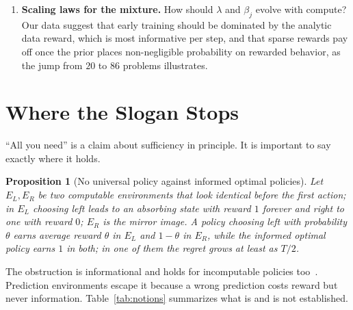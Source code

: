 \documentclass[11pt]{article}
\newtheorem{proposition}{Proposition}
\theoremstyle{definition}
\begin{document}
\begin{enumerate}[leftmargin=*,label=\textbf{P\arabic*.},itemsep=3pt]
\item \textbf{Scaling laws for the mixture.} How should $\lambda$ and $\beta_j$ evolve with compute? Our data suggest that early training should be dominated by the analytic data reward, which is most informative per step, and that sparse rewards pay off once the prior places non-negligible probability on rewarded behavior, as the jump from $20$ to $86$ problems illustrates.
\end{enumerate}

\section{Where the Slogan Stops}\label{sec:limits}

``All you need'' is a claim about sufficiency in principle. It is important to say exactly where it holds.

\begin{proposition}[No universal policy against informed optimal policies]\label{prop:trap}
Let $E_L,E_R$ be two computable environments that look identical before the first action; in $E_L$ choosing left leads to an absorbing state with reward $1$ forever and right to one with reward $0$; $E_R$ is the mirror image. A policy choosing left with probability $\theta$ earns average reward $\theta$ in $E_L$ and $1-\theta$ in $E_R$, while the informed optimal policy earns $1$ in both; in one of them the regret grows at least as $T/2$.
\end{proposition}

\noindent The obstruction is informational and holds for incomputable policies too~\cite{lattimore2011asymptotic,leike2015bad}. Prediction environments escape it because a wrong prediction costs reward but never information. Table~\ref{tab:notions} summarizes what is and is not established.
\end{document}
